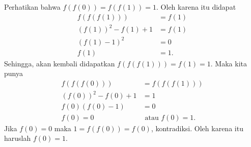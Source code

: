 
\begin{solusi}
    Perhatikan bahwa $f(f(0))=f(f(1))=1$. Oleh karena itu didapat
    \begin{align*}
        f(f(f(1))) &= f(1)\\
        (f(1))^2-f(1)+1 &= f(1)\\
        (f(1)-1)^2 &= 0\\
        f(1) &= 1.
    \end{align*}
    Sehingga, akan kembali didapatkan $f(f(f(1)))=f(1)=1$. Maka kita punya
    \begin{align*}
        f(f(f(0))) &= f(f(f(1)))\\
        (f(0))^2-f(0)+1 &= 1\\
        f(0)(f(0)-1) &= 0\\
        f(0) = 0 &\text{ atau } f(0)=1.
    \end{align*}
    Jika $f(0)=0$ maka $1=f(f(0))=f(0)$, kontradiksi. Oleh karena itu haruslah $\boxed{f(0)=1}$.
\end{solusi}